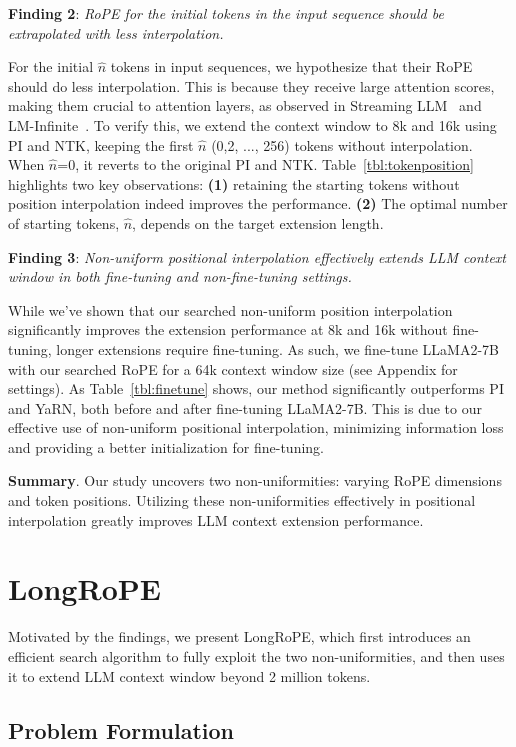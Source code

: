 \textbf{Finding 2}: \textit{RoPE for the initial tokens in the input sequence should be extrapolated with less interpolation.} 

For the initial $\hat{n}$ tokens in input sequences, we hypothesize that their RoPE should do less interpolation. This is because they receive large attention scores, making them crucial to attention layers, as observed in  Streaming LLM~\cite{streamingllm} and LM-Infinite~\cite{han2023lminfinite}. To verify this, we extend the context window to 8k and 16k using PI and NTK, keeping the first  $\hat n$ (0,2, ..., 256) tokens without interpolation. When $\hat n$=0, it reverts to the original PI and NTK. Table~\ref{tbl:tokenposition} highlights two key observations: \textbf{(1)} retaining the starting tokens without position interpolation indeed improves the performance. \textbf{(2)} The optimal number of starting tokens, $\hat n$, depends on the target extension length. 

\textbf{Finding 3}: \textit{Non-uniform positional interpolation effectively extends LLM context window in both fine-tuning and non-fine-tuning settings.} 

While we've shown that our searched non-uniform position interpolation significantly improves the extension performance at 8k and 16k without fine-tuning, longer extensions require fine-tuning. As such, we fine-tune LLaMA2-7B with our searched RoPE for a 64k context window size (see Appendix for settings). As Table~\ref{tbl:finetune} shows, our method significantly outperforms PI and YaRN, both before and after fine-tuning LLaMA2-7B. This is due to our effective use of non-uniform positional interpolation, minimizing information loss and providing a better initialization for fine-tuning.

\textbf{Summary}. Our study uncovers two non-uniformities: varying RoPE dimensions and token positions. Utilizing these non-uniformities effectively in positional interpolation greatly improves LLM context extension performance.

\section{LongRoPE}

\label{sec:method}
Motivated by the findings, we present LongRoPE, which first introduces an efficient search algorithm to fully exploit the two non-uniformities, and then uses it to extend LLM context window beyond 2 million tokens. 

\subsection{Problem Formulation}


